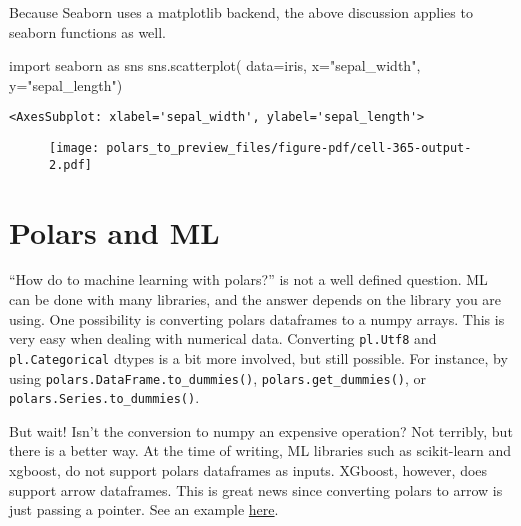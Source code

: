 \documentclass[
  letterpaper,
  DIV=11,
  numbers=noendperiod]{scrartcl}
\newenvironment{Shaded}{\begin{snugshade}}{\end{snugshade}}
\newcommand{\ImportTok}[1]{\textcolor[rgb]{0.00,0.46,0.62}{#1}}
\newcommand{\NormalTok}[1]{\textcolor[rgb]{0.00,0.23,0.31}{#1}}
\newcommand{\OperatorTok}[1]{\textcolor[rgb]{0.37,0.37,0.37}{#1}}
\newcommand{\StringTok}[1]{\textcolor[rgb]{0.13,0.47,0.30}{#1}}
\begin{document}
Because Seaborn uses a matplotlib backend, the above discussion applies
to seaborn functions as well.

\begin{Shaded}
\begin{Highlighting}[]
\ImportTok{import}\NormalTok{ seaborn }\ImportTok{as}\NormalTok{ sns}
\NormalTok{sns.scatterplot(}
\NormalTok{    data}\OperatorTok{=}\NormalTok{iris,}
\NormalTok{    x}\OperatorTok{=}\StringTok{"sepal\_width"}\NormalTok{,}
\NormalTok{    y}\OperatorTok{=}\StringTok{"sepal\_length"}\NormalTok{)}
\end{Highlighting}
\end{Shaded}

\begin{verbatim}
<AxesSubplot: xlabel='sepal_width', ylabel='sepal_length'>
\end{verbatim}

\begin{figure}[H]

{\centering \texttt{[image: polars\_to\_preview\_files/figure-pdf/cell-365-output-2.pdf]}

}

\end{figure}

\hypertarget{polars-and-ml}{%
\section{Polars and ML}\label{polars-and-ml}}

``How do to machine learning with polars?'' is not a well defined
question. ML can be done with many libraries, and the answer depends on
the library you are using. One possibility is converting polars
dataframes to a numpy arrays. This is very easy when dealing with
numerical data. Converting \texttt{pl.Utf8} and \texttt{pl.Categorical}
dtypes is a bit more involved, but still possible. For instance, by
using \texttt{polars.DataFrame.to\_dummies()},
\texttt{polars.get\_dummies()}, or \texttt{polars.Series.to\_dummies()}.

But wait! Isn't the conversion to numpy an expensive operation? Not
terribly, but there is a better way. At the time of writing, ML
libraries such as scikit-learn and xgboost, do not support polars
dataframes as inputs. XGboost, however, does support arrow dataframes.
This is great news since converting polars to arrow is just passing a
pointer. See an example
\href{https://www.rhosignal.com/posts/polars-arrow-xgboost/}{here}.
\end{document}
